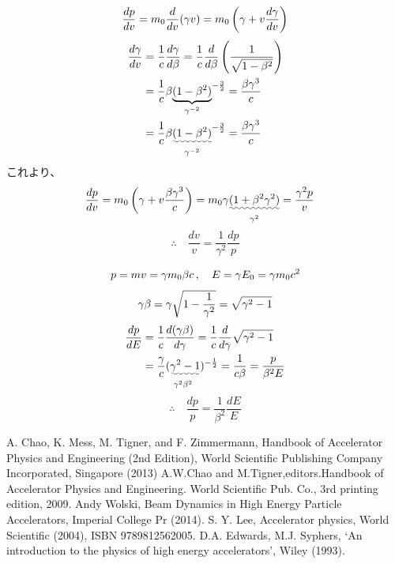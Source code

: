 \documentclass[10pt,a4paper]{ltjsarticle}
\begin{document}
\begin{equation}
    \frac{dp}{dv} = m_0\frac{d}{dv}(\gamma v)
    = m_0 \left(\gamma + v \frac{d\gamma}{dv}\right) \notag
\end{equation}
%
\begin{align}
    \frac{d\gamma}{dv} & = \frac{1}{c}\frac{d\gamma}{d\beta}= \frac{1}{c}\frac{d}{d\beta}\left(\frac{1}{\sqrt{1-\beta^2}}\right) \notag \\
    & = \frac{1}{c} \beta \underset{\gamma^{-2}}{\underbrace{(1-\beta^2)}}^{-\frac{3}{2}} = \frac{\beta \gamma^3}{c} \notag \\
    & = \frac{1}{c} \beta \underset{\gamma^{-2}}{\uwave{(1-\beta^2)}}^{-\frac{3}{2}} = \frac{\beta \gamma^3}{c} \notag
\end{align}
%
これより、
\begin{align}
    \frac{dp}{dv} & = m_0 \left(\gamma + v \frac{\beta \gamma^3}{c}\right)
    = m_0 \gamma \underset{\gamma^2}{\uwave{(1 + \beta^2 \gamma^2)}}
    = \frac{\gamma^2 p}{v} \notag
\end{align}
%
\begin{equation}
    \therefore \quad \frac{dv}{v} = \frac{1}{\gamma^2}\frac{dp}{p}
    \label{dv_dp}
\end{equation}

\begin{align}
    p = mv = \gamma m_0 \beta c\,  , \quad E = \gamma E_0 = \gamma m_0 c^2 \notag
\end{align}
%
\begin{equation}
    \gamma \beta = \gamma \sqrt{1-\frac{1}{\gamma^2}} \notag = \sqrt{\gamma^2 -1} \notag
\end{equation}
%
\begin{align}
    \frac{dp}{dE} & = \frac{1}{c}\frac{d(\gamma \beta)}{d\gamma} = \frac{1}{c}\frac{d}{d\gamma}\sqrt{\gamma^2 -1} \notag \\
    & = \frac{\gamma}{c} \underset{\gamma^2\beta^2}{(\uwave{\gamma^2 -1}})^{-\frac{1}{2}} = \frac{1}{c\beta}
    = \frac{p}{\beta^2 E}\notag
\end{align}
%
\begin{equation}
    \therefore \quad \frac{dp}{p} = \frac{1}{\beta^2}\frac{dE}{E}
\end{equation}

%
\begin{thebibliography}{9}
  A. Chao, K. Mess, M. Tigner, and F. Zimmermann, Handbook of Accelerator Physics and Engineering (2nd Edition), World Scientific Publishing Company Incorporated, Singapore (2013)
  A.W.Chao and M.Tigner,editors.Handbook of Accelerator Physics and Engineering. World Scientific Pub. Co., 3rd printing edition, 2009.
  Andy Wolski, Beam Dynamics in High Energy Particle Accelerators,  Imperial College Pr (2014).
  S. Y. Lee, Accelerator physics, World Scientific (2004), ISBN 9789812562005.
  D.A. Edwards, M.J. Syphers, `An introduction to the physics of high energy accelerators', Wiley (1993).
\end{thebibliography}
%
\end{document}
